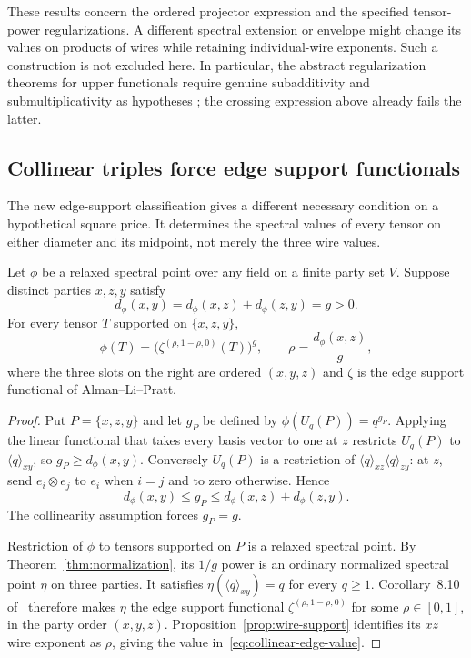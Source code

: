 These results concern the ordered projector expression and the
specified tensor-power regularizations. A different spectral
extension or envelope might change its values on products of
wires while retaining individual-wire exponents. Such a
construction is not excluded here. In particular, the abstract
regularization theorems for upper functionals require genuine
subadditivity and submultiplicativity as hypotheses
\cite[arXiv version~2, Definitions~3.1 and~3.13]{BugarVrana2025}; the crossing
expression above already fails the latter.

\subsection{Collinear triples force edge support functionals}
The new edge-support classification gives a different necessary condition on a hypothetical square price.  It determines the spectral values of every tensor on either diameter and its midpoint, not merely the three wire values.

\begin{proposition}
\label{prop:collinear-edge-point}
Let $\phi$ be a relaxed spectral point over any field on a finite party set $V$.  Suppose distinct parties $x,z,y$ satisfy
\[
 d_\phi(x,y)=d_\phi(x,z)+d_\phi(z,y)=g>0.
\]
For every tensor $T$ supported on $\{x,z,y\}$,
\begin{equation}
 \phi(T)=\bigl(\zeta^{(\rho,1-\rho,0)}(T)\bigr)^g,
 \qquad \rho=\frac{d_\phi(x,z)}{g},
 \label{eq:collinear-edge-value}
\end{equation}
where the three slots on the right are ordered $(x,y,z)$ and $\zeta$ is the edge support functional of Alman--Li--Pratt.
\end{proposition}
\begin{proof}
Put $P=\{x,z,y\}$ and let $g_P$ be defined by $\phi(U_q(P))=q^{g_P}$.  Applying the linear functional that takes every basis vector to one at $z$ restricts $U_q(P)$ to $\langle q\rangle_{xy}$, so $g_P\geq d_\phi(x,y)$.  Conversely $U_q(P)$ is a restriction of
$\langle q\rangle_{xz}\langle q\rangle_{zy}$: at $z$, send $e_i\otimes e_j$ to $e_i$ when $i=j$ and to zero otherwise.  Hence
\[
 d_\phi(x,y)\leq g_P\leq d_\phi(x,z)+d_\phi(z,y).
\]
The collinearity assumption forces $g_P=g$.

Restriction of $\phi$ to tensors supported on $P$ is a relaxed spectral point.  By Theorem~\ref{thm:normalization}, its $1/g$ power is an ordinary normalized spectral point $\eta$ on three parties.  It satisfies
$\eta(\langle q\rangle_{xy})=q$ for every $q\geq1$.
Corollary~8.10 of~\cite[page 53]{alp-edge} therefore makes $\eta$ the edge support functional $\zeta^{(\rho,1-\rho,0)}$ for some $\rho\in[0,1]$, in the party order $(x,y,z)$.  Proposition~\ref{prop:wire-support} identifies its $xz$ wire exponent as $\rho$, giving the value in~\eqref{eq:collinear-edge-value}.
\end{proof}

